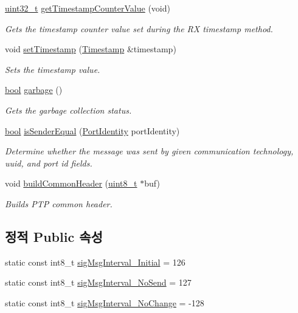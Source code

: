 \begin{DoxyCompactItemize}
\hyperlink{parse_8c_a6eb1e68cc391dd753bc8ce896dbb8315}{uint32\+\_\+t} \hyperlink{class_p_t_p_message_common_a2f9298443285c8dd689acce23b59dc8f}{get\+Timestamp\+Counter\+Value} (void)
\begin{DoxyCompactList}\small\item\em Gets the timestamp counter value set during the RX timestamp method. \end{DoxyCompactList}\item 
void \hyperlink{class_p_t_p_message_common_aa35baf97ba1690eb11defa05a40f7d05}{set\+Timestamp} (\hyperlink{class_timestamp}{Timestamp} \&timestamp)
\begin{DoxyCompactList}\small\item\em Sets the timestamp value. \end{DoxyCompactList}\item 
\hyperlink{avb__gptp_8h_af6a258d8f3ee5206d682d799316314b1}{bool} \hyperlink{class_p_t_p_message_common_a1a2b4b1eeb289619b14affa39f8284f7}{garbage} ()
\begin{DoxyCompactList}\small\item\em Gets the garbage collection status. \end{DoxyCompactList}\item 
\hyperlink{avb__gptp_8h_af6a258d8f3ee5206d682d799316314b1}{bool} \hyperlink{class_p_t_p_message_common_aa13b7c21bfbc95ca14890dea687da20b}{is\+Sender\+Equal} (\hyperlink{class_port_identity}{Port\+Identity} port\+Identity)
\begin{DoxyCompactList}\small\item\em Determine whether the message was sent by given communication technology, uuid, and port id fields. \end{DoxyCompactList}\item 
void \hyperlink{class_p_t_p_message_common_a66c6d7a38fc74d84b68e13216c82a4e6}{build\+Common\+Header} (\hyperlink{stdint_8h_aba7bc1797add20fe3efdf37ced1182c5}{uint8\+\_\+t} $\ast$buf)
\begin{DoxyCompactList}\small\item\em Builds P\+TP common header. \end{DoxyCompactList}\end{DoxyCompactItemize}
\subsection*{정적 Public 속성}
\begin{DoxyCompactItemize}
\item 
static const int8\+\_\+t \hyperlink{class_p_t_p_message_signalling_aa46796faa0e40d6a5c22d0c2ba50d991}{sig\+Msg\+Interval\+\_\+\+Initial} = 126
\item 
static const int8\+\_\+t \hyperlink{class_p_t_p_message_signalling_afcb2a19f3190abbb589f24267c8cd636}{sig\+Msg\+Interval\+\_\+\+No\+Send} = 127
\item 
static const int8\+\_\+t \hyperlink{class_p_t_p_message_signalling_af6d2439496842acecd33cf27e79e8a04}{sig\+Msg\+Interval\+\_\+\+No\+Change} = -\/128
\end{DoxyCompactItemize}
